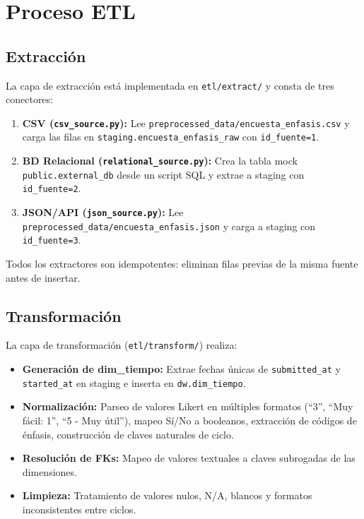 \documentclass[12pt, letterpaper]{article}
\begin{document}
\section{Proceso ETL}

\subsection{Extracción}

La capa de extracción está implementada en \texttt{etl/extract/} y consta de tres conectores:

\begin{enumerate}
  \item \textbf{CSV (\texttt{csv\_source.py}):} Lee \texttt{preprocessed\_data/encuesta\_enfasis.csv} y carga las filas en \texttt{staging.encuesta\_enfasis\_raw} con \texttt{id\_fuente=1}.
  \item \textbf{BD Relacional (\texttt{relational\_source.py}):} Crea la tabla mock \texttt{public.external\_db} desde un script SQL y extrae a staging con \texttt{id\_fuente=2}.
  \item \textbf{JSON/API (\texttt{json\_source.py}):} Lee \texttt{preprocessed\_data/encuesta\_enfasis.json} y carga a staging con \texttt{id\_fuente=3}.
\end{enumerate}

Todos los extractores son idempotentes: eliminan filas previas de la misma fuente antes de insertar.

\subsection{Transformación}

La capa de transformación (\texttt{etl/transform/}) realiza:

\begin{itemize}
  \item \textbf{Generación de dim\_tiempo:} Extrae fechas únicas de \texttt{submitted\_at} y \texttt{started\_at} en staging e inserta en \texttt{dw.dim\_tiempo}.
  \item \textbf{Normalización:} Parseo de valores Likert en múltiples formatos (``3'', ``Muy fácil: 1'', ``5 - Muy útil''), mapeo Sí/No a booleanos, extracción de códigos de énfasis, construcción de claves naturales de ciclo.
  \item \textbf{Resolución de FKs:} Mapeo de valores textuales a claves subrogadas de las dimensiones.
  \item \textbf{Limpieza:} Tratamiento de valores nulos, N/A, blancos y formatos inconsistentes entre ciclos.
\end{itemize}
\end{document}

